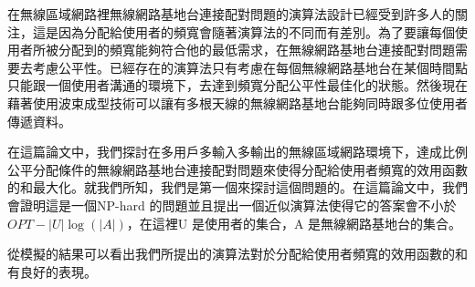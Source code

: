 
在無線區域網路裡無線網路基地台連接配對問題的演算法設計已經受到許多人的關注，這是因為分配給使用者的頻寬會隨著演算法的不同而有差別。為了要讓每個使用者所被分配到的頻寬能夠符合他的最低需求，在無線網路基地台連接配對問題需要去考慮公平性。已經存在的演算法只有考慮在每個無線網路基地台在某個時間點只能跟一個使用者溝通的環境下，去達到頻寬分配公平性最佳化的狀態。然後現在藉著使用波束成型技術可以讓有多根天線的無線網路基地台能夠同時跟多位使用者傳遞資料。

在這篇論文中，我們探討在多用戶多輸入多輸出的無線區域網路環境下，達成比例公平分配條件的無線網路基地台連接配對問題來使得分配給使用者頻寬的效用函數的和最大化。就我們所知，我們是第一個來探討這個問題的。在這篇論文中，我們會證明這是一個NP-hard 的問題並且提出一個近似演算法使得它的答案會不小於$OPT - |U|\log(|A|)$，在這裡U 是使用者的集合，A 是無線網路基地台的集合。

從模擬的結果可以看出我們所提出的演算法對於分配給使用者頻寬的效用函數的和有良好的表現。
